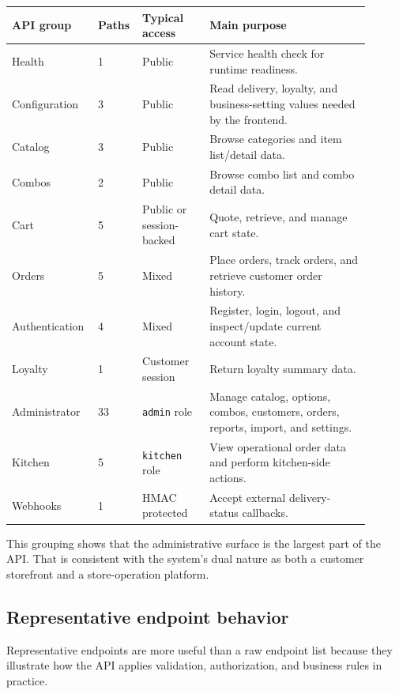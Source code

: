 \begingroup
\small
\setlength{\LTpre}{0.4em}
\setlength{\LTpost}{0.8em}
\label{tab:api-surface}
\begin{tabular}{L{0.19\linewidth} L{0.10\linewidth} L{0.18\linewidth} L{0.43\linewidth}}
\toprule
\textbf{API group} & \textbf{Paths} & \textbf{Typical access} & \textbf{Main purpose} \\
\midrule
Health & 1 & Public & Service health check for runtime readiness. \\
Configuration & 3 & Public & Read delivery, loyalty, and business-setting values needed by the frontend. \\
Catalog & 3 & Public & Browse categories and item list/detail data. \\
Combos & 2 & Public & Browse combo list and combo detail data. \\
Cart & 5 & Public or session-backed & Quote, retrieve, and manage cart state. \\
Orders & 5 & Mixed & Place orders, track orders, and retrieve customer order history. \\
Authentication & 4 & Mixed & Register, login, logout, and inspect/update current account state. \\
Loyalty & 1 & Customer session & Return loyalty summary data. \\
Administrator & 33 & \texttt{admin} role & Manage catalog, options, combos, customers, orders, reports, import, and settings. \\
Kitchen & 5 & \texttt{kitchen} role & View operational order data and perform kitchen-side actions. \\
Webhooks & 1 & HMAC protected & Accept external delivery-status callbacks. \\
\bottomrule
\end{tabular}
\endgroup

This grouping shows that the administrative surface is the largest part of the API. That is consistent with the system's dual nature as both a customer storefront and a store-operation platform.

\subsection{Representative endpoint behavior}

Representative endpoints are more useful than a raw endpoint list because they illustrate how the API applies validation, authorization, and business rules in practice.

